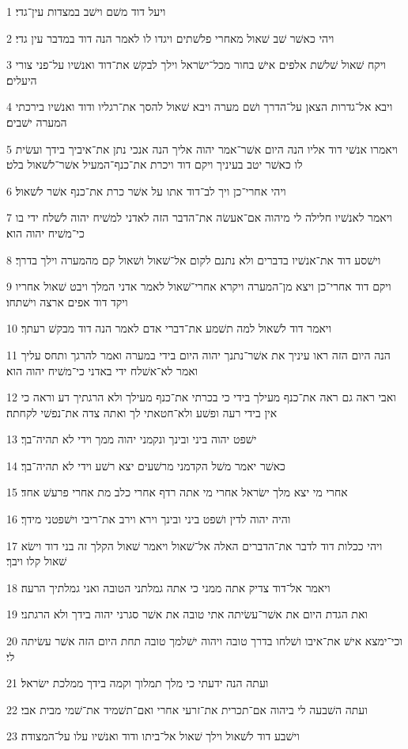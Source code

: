 \par 1 ויעל דוד משׁם וישׁב במצדות עין־גדי׃
\par 2 ויהי כאשׁר שׁב שׁאול מאחרי פלשׁתים ויגדו לו לאמר הנה דוד במדבר עין גדי׃
\par 3 ויקח שׁאול שׁלשׁת אלפים אישׁ בחור מכל־ישׂראל וילך לבקשׁ את־דוד ואנשׁיו על־פני צורי היעלים׃
\par 4 ויבא אל־גדרות הצאן על־הדרך ושׁם מערה ויבא שׁאול להסך את־רגליו ודוד ואנשׁיו בירכתי המערה ישׁבים׃
\par 5 ויאמרו אנשׁי דוד אליו הנה היום אשׁר־אמר יהוה אליך הנה אנכי נתן את־איביך בידך ועשׂית לו כאשׁר יטב בעיניך ויקם דוד ויכרת את־כנף־המעיל אשׁר־לשׁאול בלט׃
\par 6 ויהי אחרי־כן ויך לב־דוד אתו על אשׁר כרת את־כנף אשׁר לשׁאול׃
\par 7 ויאמר לאנשׁיו חלילה לי מיהוה אם־אעשׂה את־הדבר הזה לאדני למשׁיח יהוה לשׁלח ידי בו כי־משׁיח יהוה הוא׃
\par 8 וישׁסע דוד את־אנשׁיו בדברים ולא נתנם לקום אל־שׁאול ושׁאול קם מהמערה וילך בדרך׃
\par 9 ויקם דוד אחרי־כן ויצא מן־המערה ויקרא אחרי־שׁאול לאמר אדני המלך ויבט שׁאול אחריו ויקד דוד אפים ארצה וישׁתחו׃
\par 10 ויאמר דוד לשׁאול למה תשׁמע את־דברי אדם לאמר הנה דוד מבקשׁ רעתך׃
\par 11 הנה היום הזה ראו עיניך את אשׁר־נתנך יהוה היום בידי במערה ואמר להרגך ותחס עליך ואמר לא־אשׁלח ידי באדני כי־משׁיח יהוה הוא׃
\par 12 ואבי ראה גם ראה את־כנף מעילך בידי כי בכרתי את־כנף מעילך ולא הרגתיך דע וראה כי אין בידי רעה ופשׁע ולא־חטאתי לך ואתה צדה את־נפשׁי לקחתה׃
\par 13 ישׁפט יהוה ביני ובינך ונקמני יהוה ממך וידי לא תהיה־בך׃
\par 14 כאשׁר יאמר משׁל הקדמני מרשׁעים יצא רשׁע וידי לא תהיה־בך׃
\par 15 אחרי מי יצא מלך ישׂראל אחרי מי אתה רדף אחרי כלב מת אחרי פרעשׁ אחד׃
\par 16 והיה יהוה לדין ושׁפט ביני ובינך וירא וירב את־ריבי וישׁפטני מידך׃
\par 17 ויהי ככלות דוד לדבר את־הדברים האלה אל־שׁאול ויאמר שׁאול הקלך זה בני דוד וישׂא שׁאול קלו ויבך׃
\par 18 ויאמר אל־דוד צדיק אתה ממני כי אתה גמלתני הטובה ואני גמלתיך הרעה׃
\par 19 ואת הגדת היום את אשׁר־עשׂיתה אתי טובה את אשׁר סגרני יהוה בידך ולא הרגתני׃
\par 20 וכי־ימצא אישׁ את־איבו ושׁלחו בדרך טובה ויהוה ישׁלמך טובה תחת היום הזה אשׁר עשׂיתה לי׃
\par 21 ועתה הנה ידעתי כי מלך תמלוך וקמה בידך ממלכת ישׂראל׃
\par 22 ועתה השׁבעה לי ביהוה אם־תכרית את־זרעי אחרי ואם־תשׁמיד את־שׁמי מבית אבי׃
\par 23 וישׁבע דוד לשׁאול וילך שׁאול אל־ביתו ודוד ואנשׁיו עלו על־המצודה׃

